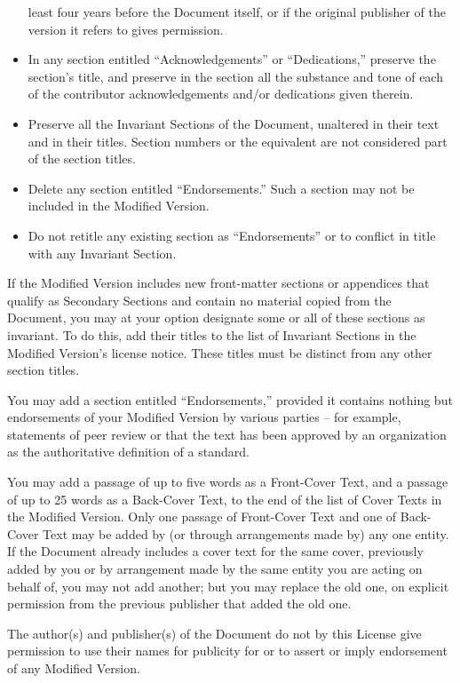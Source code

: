\documentclass{doc}
\begin{document}
\begin{itemize}
   least four years before the Document itself, or if the original
   publisher of the version it refers to gives permission.
\item In any section entitled ``Acknowledgements'' or ``Dedications,''
   preserve the section's title, and preserve in the section all the
   substance and tone of each of the contributor acknowledgements
   and/or dedications given therein.
\item Preserve all the Invariant Sections of the Document,
   unaltered in their text and in their titles.  Section numbers
   or the equivalent are not considered part of the section titles.
\item Delete any section entitled ``Endorsements.''  Such a section
   may not be included in the Modified Version.
\item Do not retitle any existing section as ``Endorsements''
   or to conflict in title with any Invariant Section.
\end{itemize}

If the Modified Version includes new front-matter sections or
appendices that qualify as Secondary Sections and contain no material
copied from the Document, you may at your option designate some or all
of these sections as invariant.  To do this, add their titles to the
list of Invariant Sections in the Modified Version's license notice.
These titles must be distinct from any other section titles.

You may add a section entitled ``Endorsements,'' provided it contains
nothing but endorsements of your Modified Version by various
parties -- for example, statements of peer review or that the text has
been approved by an organization as the authoritative definition of a
standard.

You may add a passage of up to five words as a Front-Cover Text, and a
passage of up to 25 words as a Back-Cover Text, to the end of the list
of Cover Texts in the Modified Version.  Only one passage of
Front-Cover Text and one of Back-Cover Text may be added by (or
through arrangements made by) any one entity.  If the Document already
includes a cover text for the same cover, previously added by you or
by arrangement made by the same entity you are acting on behalf of,
you may not add another; but you may replace the old one, on explicit
permission from the previous publisher that added the old one.

The author(s) and publisher(s) of the Document do not by this License
give permission to use their names for publicity for or to assert or
imply endorsement of any Modified Version.
\end{document}
